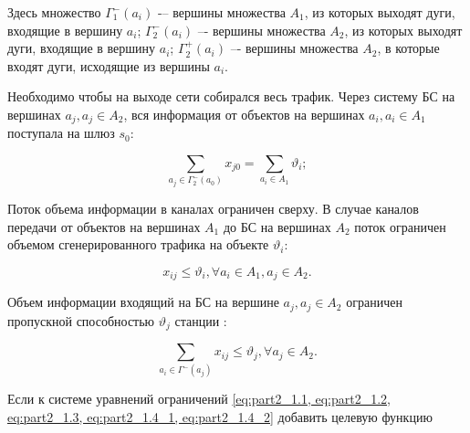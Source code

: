 Здесь множество $\Gamma_1^-(a_i)$ -– вершины множества $A_1$, из которых выходят дуги, входящие в вершину $a_i$; $\Gamma_2^-(a_i)$ –- вершины множества $A_2$, из которых выходят дуги, входящие в  вершину $a_i$; $\Gamma_2^+(a_i)$ –- вершины множества $A_2$, в которые входят дуги, исходящие из вершины $a_i$.


Необходимо чтобы на выходе сети собирался весь трафик. Через систему БС на вершинах $a_j, a_j \in A_2$, вся информация от объектов на вершинах $a_i, a_i \in A_1$ поступала  на шлюз $s_0$:

\begin{equation}\label{eq:part2_1.3}
    \sum_{a_j \in \Gamma_2^-(a_0)} x_{j0} =  \sum_{a_i \in A_1} \vartheta_i;
\end{equation}


Поток объема информации в каналах ограничен сверху. В случае каналов передачи от объектов на вершинах $A_1$ до БС на вершинах $A_2$ поток ограничен объемом сгенерированного трафика на объекте $\vartheta_i$:


\begin{equation}\label{eq:part2_1.4_1}
    x_{ij} \leqslant \vartheta_i, \forall a_i \in A_1, a_j \in A_2.
\end{equation}



Объем информации входящий на БС на вершине $a_j, a_j \in A_2$ ограничен пропускной способностью $\vartheta_j$ станции : 


\begin{equation}\label{eq:part2_1.4_2}
    \sum_{a_i \in \Gamma^-(a_j)} x_{ij} \leqslant \vartheta_j, \forall a_j \in A_2.
\end{equation}


Если к системе уравнений ограничений \cref{eq:part2_1.1, eq:part2_1.2, eq:part2_1.3, eq:part2_1.4_1, eq:part2_1.4_2} добавить целевую функцию

